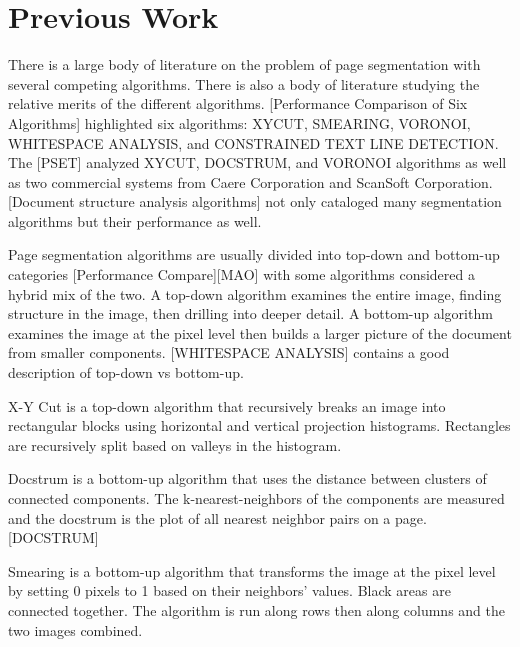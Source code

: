 \documentclass[conference]{IEEEtran}
\begin{document}
%
%

\section{Previous Work}

There is a large body of literature on the problem of page segmentation with
several competing algorithms. There is also a body of literature studying the
relative merits of the different algorithms. [Performance Comparison of Six
Algorithms] highlighted six algorithms: XYCUT, SMEARING, VORONOI, WHITESPACE
ANALYSIS, and CONSTRAINED TEXT LINE DETECTION. The [PSET] analyzed XYCUT,
DOCSTRUM, and VORONOI algorithms as well as two commercial systems from
Caere Corporation and ScanSoft Corporation. [Document structure analysis
algorithms] not only cataloged many segmentation algorithms but their
performance as well.

Page segmentation algorithms are usually divided into top-down and bottom-up
categories [Performance Compare][MAO] with some algorithms considered a hybrid
mix of the two. A top-down algorithm examines the entire image, finding
structure in the image, then drilling into deeper detail.  A bottom-up
algorithm examines the image at the pixel level then builds a larger picture of
the document from smaller components. [WHITESPACE ANALYSIS] contains a good
description of top-down vs bottom-up.

X-Y Cut is a top-down algorithm that recursively breaks an image
into rectangular blocks using horizontal and vertical projection histograms.
Rectangles are recursively split based on valleys in the histogram. 

Docstrum is a bottom-up algorithm that uses the distance between clusters of
connected components. The k-nearest-neighbors of the components are measured
and the docstrum is the plot of all nearest neighbor pairs on a page.
[DOCSTRUM]

Smearing is a bottom-up algorithm that transforms the image at the pixel level
by setting 0 pixels to 1 based on their neighbors' values. Black areas are
connected together. The algorithm is run along rows then along columns and the
two images combined.
\end{document}
